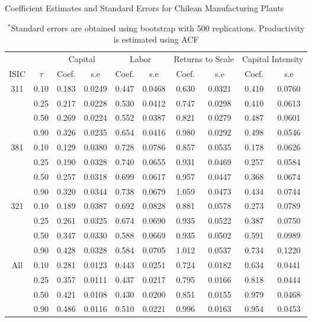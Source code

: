 \documentclass[11pt]{article}
\begin{document}
\begin{table}[H]
\centering
\caption{Coefficient Estimates and Standard Errors for Chilean Manufacturing Plants}
\begin{tabular}{cccccccccc}
  \hline\hline & & \multicolumn{2}{c}{Capital}  & \multicolumn{2}{c}{Labor} & \multicolumn{2}{c}{Returns to Scale} & \multicolumn{2}{c}{Capital Intensity}\\ \cmidrule(lr){3-4} \cmidrule(lr){5-6} \cmidrule(lr){7-8} \cmidrule(lr){9-10}ISIC & $\tau$ & Coef. & s.e & Coef. & s.e & Coef. & s.e & Coef. & s.e \\ 
  \hline
311 & 0.10 & 0.183 & 0.0249 & 0.447 & 0.0468 & 0.630 & 0.0321 & 0.410 & 0.0760 \\ 
   & 0.25 & 0.217 & 0.0228 & 0.530 & 0.0412 & 0.747 & 0.0298 & 0.410 & 0.0613 \\ 
   & 0.50 & 0.269 & 0.0224 & 0.552 & 0.0387 & 0.821 & 0.0279 & 0.487 & 0.0601 \\ 
   & 0.90 & 0.326 & 0.0235 & 0.654 & 0.0416 & 0.980 & 0.0292 & 0.498 & 0.0546 \\ 
  381 & 0.10 & 0.129 & 0.0380 & 0.728 & 0.0786 & 0.857 & 0.0535 & 0.178 & 0.0626 \\ 
   & 0.25 & 0.190 & 0.0328 & 0.740 & 0.0655 & 0.931 & 0.0469 & 0.257 & 0.0584 \\ 
   & 0.50 & 0.257 & 0.0318 & 0.699 & 0.0617 & 0.957 & 0.0447 & 0.368 & 0.0674 \\ 
   & 0.90 & 0.320 & 0.0344 & 0.738 & 0.0679 & 1.059 & 0.0473 & 0.434 & 0.0744 \\ 
  321 & 0.10 & 0.189 & 0.0387 & 0.692 & 0.0828 & 0.881 & 0.0578 & 0.273 & 0.0789 \\ 
   & 0.25 & 0.261 & 0.0325 & 0.674 & 0.0690 & 0.935 & 0.0522 & 0.387 & 0.0750 \\ 
   & 0.50 & 0.347 & 0.0330 & 0.588 & 0.0669 & 0.935 & 0.0502 & 0.591 & 0.0989 \\ 
   & 0.90 & 0.428 & 0.0328 & 0.584 & 0.0705 & 1.012 & 0.0537 & 0.734 & 0.1220 \\ 
  All & 0.10 & 0.281 & 0.0123 & 0.443 & 0.0251 & 0.724 & 0.0182 & 0.634 & 0.0441 \\ 
   & 0.25 & 0.357 & 0.0111 & 0.437 & 0.0217 & 0.795 & 0.0166 & 0.818 & 0.0444 \\ 
   & 0.50 & 0.421 & 0.0108 & 0.430 & 0.0200 & 0.851 & 0.0155 & 0.979 & 0.0468 \\ 
   & 0.90 & 0.486 & 0.0116 & 0.510 & 0.0221 & 0.996 & 0.0163 & 0.954 & 0.0453 \\ 
   \hline
\end{tabular}
\caption*{\footnotesize $^{*}$Standard errors are obtained using bootstrap with 500 replications. Productivity is estimated using ACF}
\label{CHLestACF}
\end{table}
\end{document}
